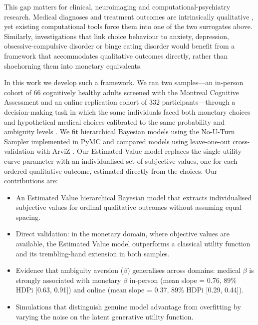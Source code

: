 This gap matters for clinical, neuroimaging and computational-psychiatry research. Medical diagnoses and treatment outcomes are intrinsically qualitative \citep{basu2018vio,james2017prostate}, yet existing computational tools force them into one of the two surrogates above. Similarly, investigations that link choice behaviour to anxiety, depression, obsessive-compulsive disorder or binge eating disorder \citep{ruderman2016ptsd,voon2015bed} would benefit from a framework that accommodates qualitative outcomes directly, rather than shoehorning them into monetary equivalents.

In this work we develop such a framework. We ran two samples---an in-person cohort of 66 cognitively healthy adults screened with the Montreal Cognitive Assessment \citep{nasreddine2005moca,fujiwara2010mocaj} and an online replication cohort of 332 participants---through a decision-making task in which the same individuals faced both monetary choices and hypothetical medical choices calibrated to the same probability and ambiguity levels \citep{levy2012measuring,jia2020learning}. We fit hierarchical Bayesian models using the No-U-Turn Sampler implemented in PyMC \citep{hoffman2014nuts,salvatier2016pymc3} and compared models using leave-one-out cross-validation with ArviZ \citep{kumar2019arviz,vehtari2017loo}. Our Estimated Value model replaces the single utility-curve parameter with an individualised set of subjective values, one for each ordered qualitative outcome, estimated directly from the choices. Our contributions are:
\begin{itemize}
  \item An Estimated Value hierarchical Bayesian model that extracts individualised subjective values for ordinal qualitative outcomes without assuming equal spacing.
  \item Direct validation: in the monetary domain, where objective values are available, the Estimated Value model outperforms a classical utility function and its trembling-hand extension in both samples.
  \item Evidence that ambiguity aversion ($\beta$) generalises across domains: medical $\beta$ is strongly associated with monetary $\beta$ in-person (mean slope = 0.76, 89\% HDPi [0.63, 0.91]) and online (mean slope = 0.37, 89\% HDPi [0.29, 0.44]).
  \item Simulations that distinguish genuine model advantage from overfitting by varying the noise on the latent generative utility function.
\end{itemize}

